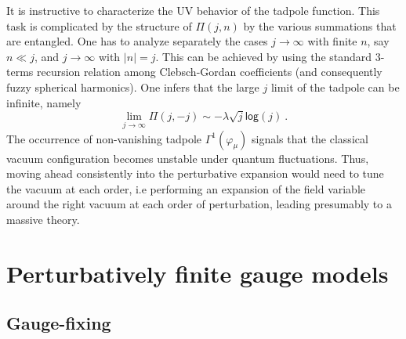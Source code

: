 \documentclass[11pt]{book}
\renewcommand{\log}{\mathsf{log}}
\theoremstyle{break}
\begin{document}
It is instructive to characterize the UV behavior of the tadpole function. This task is complicated by the structure of $\Pi(j,n)$ by the various summations that are entangled. One has to analyze separately the cases $j\to\infty$ with finite $n$, say $n\ll j$, and $j\to\infty$ with $\vert n\vert=j$. This can be achieved by using the standard 3-terms recursion relation among Clebsch-Gordan coefficients (and consequently fuzzy spherical harmonics). One infers that the large $j$ limit of the tadpole can be infinite, namely
%
\begin{equation}
\lim_{j\to\infty}\Pi(j,-j)\sim-{\lambda}{\sqrt{j}}\log(j) \ . \label{limit-effectv}
\end{equation}
%
The occurrence of non-vanishing tadpole $\Gamma^1(\varphi_\mu)$ signals that the classical vacuum configuration becomes unstable under quantum fluctuations. Thus, moving ahead consistently into the perturbative expansion would need to tune the vacuum at each order, i.e performing an expansion of the field variable around the right vacuum at each order of perturbation, leading presumably to a massive theory.

\newpage
\section*{Perturbatively finite gauge models}


\subsection*{Gauge-fixing}\label{subsection31}
\end{document}
